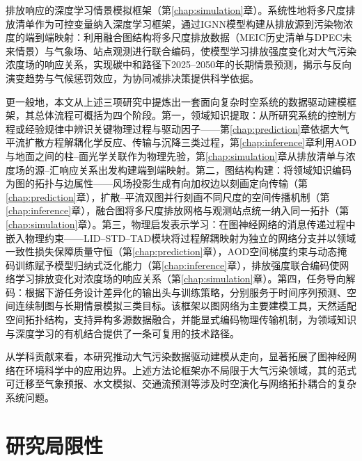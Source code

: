 排放响应的深度学习情景模拟框架（第\ref{chap:simulation}章）。系统性地将多尺度排放清单作为可控变量纳入深度学习框架，通过IGNN模型构建从排放源到污染物浓度的端到端映射：利用融合图结构将多尺度排放数据（MEIC历史清单与DPEC未来情景）与气象场、站点观测进行联合编码，使模型学习排放强度变化对大气污染浓度场的响应关系，实现碳中和路径下2025--2050年的长期情景预测，揭示\PM 与\ozone 反向演变趋势与气候惩罚效应，为协同减排决策提供科学依据。

更一般地，本文从上述三项研究中提炼出一套面向复杂时空系统的数据驱动建模框架，其总体流程可概括为四个阶段。第一，领域知识提取：从所研究系统的控制方程或经验规律中辨识关键物理过程与驱动因子——第\ref{chap:prediction}章依据大气平流扩散方程解耦化学反应、传输与沉降三类过程，第\ref{chap:inference}章利用AOD与地面\PM 之间的柱--面光学关联作为物理先验，第\ref{chap:simulation}章从排放清单与浓度场的源--汇响应关系出发构建端到端映射。第二，图结构构建：将领域知识编码为图的拓扑与边属性——风场投影生成有向加权边以刻画定向传输（第\ref{chap:prediction}章），扩散--平流双图并行刻画不同尺度的空间传播机制（第\ref{chap:inference}章），融合图将多尺度排放网格与观测站点统一纳入同一拓扑（第\ref{chap:simulation}章）。第三，物理启发表示学习：在图神经网络的消息传递过程中嵌入物理约束——LID--STD--TAD模块将过程解耦映射为独立的网络分支并以领域一致性损失保障质量守恒（第\ref{chap:prediction}章），AOD空间梯度约束与动态掩码训练赋予模型归纳式泛化能力（第\ref{chap:inference}章），排放强度联合编码使网络学习排放变化对浓度场的响应关系（第\ref{chap:simulation}章）。第四，任务导向解码：根据下游任务设计差异化的输出头与训练策略，分别服务于时间序列预测、空间连续制图与长期情景模拟三类目标。该框架以图网络为主要建模工具，天然适配空间拓扑结构，支持异构多源数据融合，并能显式编码物理传输机制，为领域知识与深度学习的有机结合提供了一条可复用的技术路径。

从学科贡献来看，本研究推动大气污染数据驱动建模从走向，显著拓展了图神经网络在环境科学中的应用边界。上述方法论框架亦不局限于大气污染领域，其的范式可迁移至气象预报、水文模拟、交通流预测等涉及时空演化与网络拓扑耦合的复杂系统问题。


\section{研究局限性}
\label{sec:limitations}


